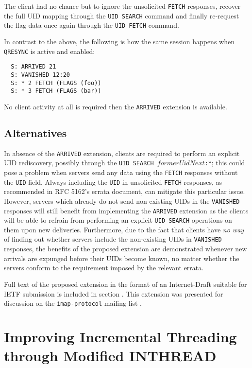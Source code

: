\documentclass[trojita]{subfiles}
\begin{document}
The client had no chance but to ignore the unsolicited {\tt FETCH} responses, recover the full UID mapping through the
{\tt UID SEARCH} command and finally re-request the flag data once again through the {\tt UID FETCH} command.

In contrast to the above, the following is how the same session happens when {\tt QRESYNC} is active and enabled:

\begin{verbatim}
  S: ARRIVED 21
  S: VANISHED 12:20
  S: * 2 FETCH (FLAGS (foo))
  S: * 3 FETCH (FLAGS (bar))
\end{verbatim}

No client activity at all is required then the {\tt ARRIVED} extension is available.

\subsection{Alternatives}

In absence of the {\tt ARRIVED} extension, clients are required to perform an explicit UID rediscovery, possibly through
the {\tt UID SEARCH $formerUidNext$:*}; this could pose a problem when servers send any data using the {\tt FETCH}
responses without the {\tt UID} field.  Always including the {\tt UID} in unsolicited {\tt FETCH} responses, as
recommended in RFC 5162's errata document, can mitigate this particular issue.  However, servers which already do not
send non-existing UIDs in the {\tt VANISHED} responses will still benefit from implementing the {\tt ARRIVED} extension
as the clients will be able to refrain from performing an explicit {\tt UID SEARCH} operations on them upon new
deliveries.  Furthermore, due to the fact that clients have {\em no way} of finding out whether servers include the
non-existing UIDs in {\tt VANISHED} responses, the benefits of the proposed extension are demonstrated whenever new
arrivals are expunged before their UIDs become known, no matter whether the servers conform to the requirement imposed
by the relevant errata.

Full text of the proposed extension in the format of an Internet-Draft suitable for IETF submission is included in
section .  This extension was presented for discussion on the {\tt imap-protocol}
mailing list \cite{jkt-i-p-draft-qresync-arrived-01}.

\section{Improving Incremental Threading through Modified INTHREAD}
\label{sec:draft-incthread}
\end{document}

